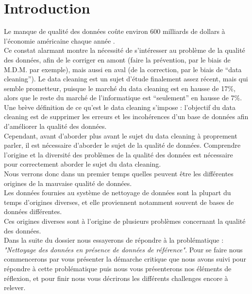 \section{Introduction}
Le manque de qualité des données coûte environ 600 milliards de dollars à l’économie américaine chaque année \cite{Interaction}.\\
Ce constat alarmant montre la nécessité de s’intéresser au problème de la qualité des données, afin de le corriger en amont (faire la prévention, par le biais de M.D.M. par exemple), mais aussi en aval (de la correction, par le biais de “data cleaning”).
Le data cleaning est un sujet d’étude finalement assez récent, mais qui semble prometteur, puisque le marché du data cleaning est en hausse de 17\%, alors que le reste du marché de l’informatique est “seulement” en hausse de 7\%.\\
Une brève définition de ce qu’est le data cleaning s’impose : l’objectif du data cleaning est de supprimer les erreurs et les incohérences d’un base de données afin d’améliorer la qualité des données.\\
Cependant, avant d’aborder plus avant le sujet du data cleaning à proprement parler, il est nécessaire d’aborder le sujet de la qualité de données. Comprendre l’origine et la diversité des problèmes de la qualité des données est nécessaire pour correctement aborder le sujet du data cleaning.\\
Nous verrons donc dans un premier temps quelles peuvent être les différentes origines de la mauvaise qualité de données.\\
Les données fournies au système de nettoyage de données sont la plupart du temps d’origines diverses, et elle proviennent notamment souvent de bases de données différentes.\\
Ces origines diverses sont à l’origine de plusieurs problèmes concernant la qualité des données.\\



Dans la suite du dossier nous essayerons de répondre à la problématique : \textit{"Nettoyage des données en présence de données de référence"}. Pour se faire nous commencerons par vous présenter la démarche critique que nous avons suivi pour répondre à cette problématique puis nous vous présenterons nos éléments de réflexion, et pour finir nous vous décrirons les différents challenges encore à relever. 